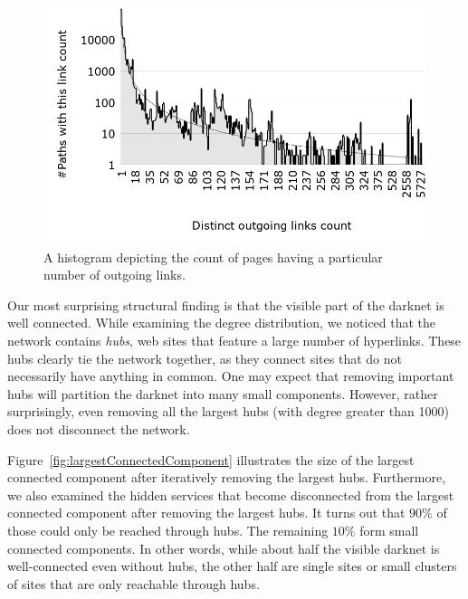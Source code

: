 \begin{figure}[H]
    \centering
    \includegraphics[width=\linewidth]{images/DistinctOutgoingLinksCount.png}
    \caption{A histogram depicting the count of pages having a particular
             number of outgoing links.}
    \label{fig:outgoingPowerLaw}
\end{figure}

Our most surprising structural finding is that the visible part of the darknet is well connected. 
While examining the degree distribution, we noticed that the network contains \emph{hubs}, web sites that feature a large number of hyperlinks.  These hubs clearly tie the network together, as they connect sites that do not necessarily have anything in common.
One may expect that removing important hubs will partition the darknet into many small components. However, rather surprisingly, even removing all the largest hubs (with degree greater than 1000) does not disconnect the network.

Figure~\ref{fig:largestConnectedComponent} illustrates the size of the largest connected component after iteratively removing the largest hubs.
Furthermore, we also examined the hidden services that become disconnected from the largest connected component after removing the largest hubs. It turns out that $90\%$ of those could only be reached through hubs. The remaining $10\%$ form small connected components. In other words, while about half the visible darknet is well-connected even without hubs, the other half are single sites or small clusters of sites that are only reachable through hubs. 

